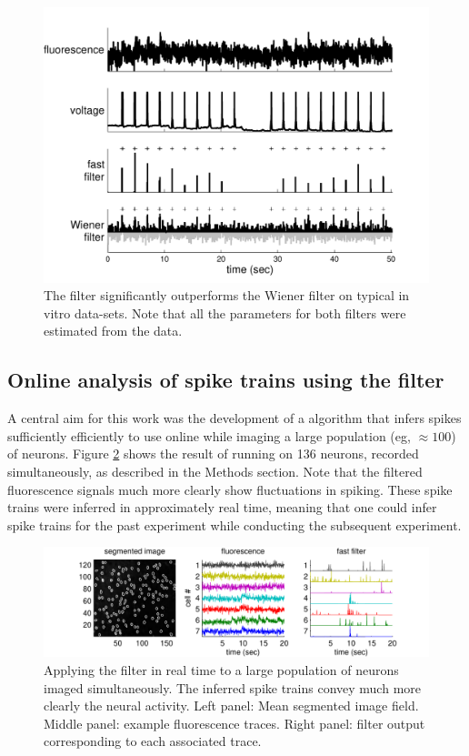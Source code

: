 \begin{figure}[h!]
\centering \includegraphics[width=.9\linewidth]{../figs/woopsi_data4}
\caption{The \foopsi filter significantly outperforms the Wiener filter on typical in vitro data-sets.  Note that all the parameters for both filters were estimated from the data.} \label{fig:woopsi_data}
\end{figure}

\subsection{Online analysis of spike trains using the \foopsi filter}

A central aim for this work was the development of a algorithm that infers spikes sufficiently efficiently to use online while imaging a large population (eg, $\approx 100$) of neurons.  Figure \ref{fig:pop} shows the result of running \foopsi on 136 neurons, recorded simultaneously, as described in the Methods section.  Note that the filtered fluorescence signals much more clearly show fluctuations in spiking. These spike trains were inferred in approximately real time, meaning that one could infer spike trains for the past experiment while conducting the subsequent experiment.


\begin{figure}[h!]
\centering \includegraphics[width=.9\linewidth]{../figs/pop}
\caption{Applying the \foopsi filter in real time to a large population of neurons imaged simultaneously.  The inferred spike trains convey much more clearly the neural activity.  Left panel: Mean segmented image field.  Middle panel: example fluorescence traces.  Right panel: \foopsi filter output corresponding to each associated trace.} \label{fig:pop}
\end{figure}


